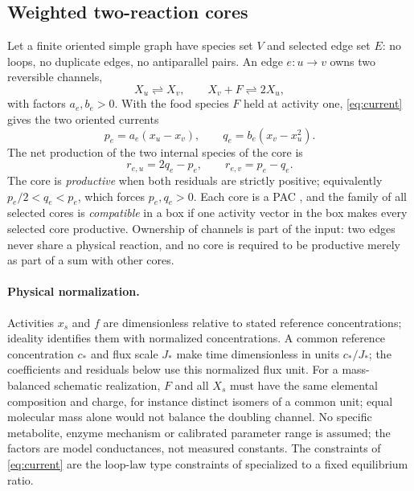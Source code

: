 \documentclass[11pt,a4paper]{article}
\theoremstyle{plain}
\theoremstyle{definition}
\theoremstyle{remark}
\newcommand{\rev}{\rightleftharpoons}
\newcommand{\ru}{r_{e,u}}
\newcommand{\rv}{r_{e,v}}
\begin{document}
\subsection{Weighted two-reaction cores}

Let a finite oriented simple graph have species set $V$ and selected edge set $E$: no loops, no duplicate edges, no antiparallel pairs. An edge $e\colon u\to v$ owns two reversible channels,
\begin{equation}\label{eq:chemistry}
  X_u\rev X_v,\qquad X_v+F\rev 2X_u,
\end{equation}
with factors $a_e,b_e>0$. With the food species $F$ held at activity one, \eqref{eq:current} gives the two oriented currents
\begin{equation}\label{eq:currents}
  p_e=a_e(x_u-x_v),\qquad q_e=b_e(x_v-x_u^2).
\end{equation}
The net production of the two internal species of the core is
\begin{equation}\label{eq:residuals}
  \ru=2q_e-p_e,\qquad \rv=p_e-q_e .
\end{equation}
The core is \emph{productive} when both residuals are strictly positive; equivalently $p_e/2<q_e<p_e$, which forces $p_e,q_e>0$. Each core is a PAC \citep{tcch2026}, and the family of all selected cores is \emph{compatible} in a box if one activity vector in the box makes every selected core productive. Ownership of channels is part of the input: two edges never share a physical reaction, and no core is required to be productive merely as part of a sum with other cores.

\paragraph{Physical normalization.} Activities $x_s$ and $f$ are dimensionless relative to stated reference concentrations; ideality identifies them with normalized concentrations. A common reference concentration $c_*$ and flux scale $J_*$ make time dimensionless in units $c_*/J_*$; the coefficients and residuals below use this normalized flux unit. For a mass-balanced schematic realization, $F$ and all $X_s$ must have the same elemental composition and charge, for instance distinct isomers of a common unit; equal molecular mass alone would not balance the doubling channel. No specific metabolite, enzyme mechanism or calibrated parameter range is assumed; the factors are model conductances, not measured constants. The constraints of \eqref{eq:current} are the loop-law type constraints of \citep{beard2004} specialized to a fixed equilibrium ratio.
\end{document}
